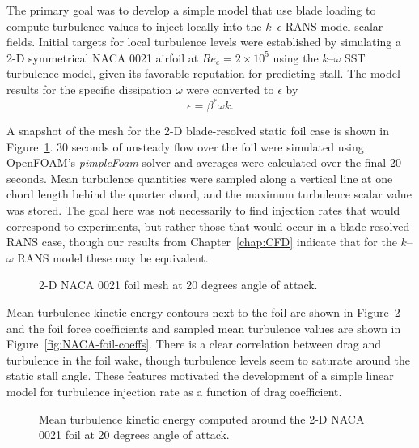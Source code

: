 The primary goal was to develop a simple model that use blade loading to compute
turbulence values to inject locally into the $k$--$\epsilon$ RANS model scalar
fields. Initial targets for local turbulence levels were established by
simulating a 2-D symmetrical NACA 0021 airfoil at $Re_c = 2 \times 10^5$ using
the $k$--$\omega$ SST turbulence model, given its favorable reputation for
predicting stall. The model results for the specific dissipation $\omega$ were
converted to $\epsilon$ by \cite{Wilcox1994}
\begin{equation}
    \epsilon = \beta^* \omega k.
\end{equation}

A snapshot of the mesh for the 2-D blade-resolved static foil case is shown in
Figure~\ref{fig:NACA-foil-mesh}. 30 seconds of unsteady flow over the foil were
simulated using OpenFOAM's \textit{pimpleFoam} solver and averages were
calculated over the final 20 seconds. Mean turbulence quantities were sampled
along a vertical line at one chord length behind the quarter chord, and the
maximum turbulence scalar value was stored. The goal here was not necessarily to
find injection rates that would correspond to experiments, but rather those that
would occur in a blade-resolved RANS case, though our results from
Chapter~\ref{chap:CFD} indicate that for the $k$--$\omega$ RANS model these may
be equivalent.

\begin{figure}
    \centering
    
    \caption{2-D NACA 0021 foil mesh at 20 degrees angle of attack.}
    
    \label{fig:NACA-foil-mesh}
\end{figure}

Mean turbulence kinetic energy contours next to the foil are shown in
Figure~\ref{fig:NACA-foil-k} and the foil force coefficients and sampled mean
turbulence values are shown in Figure~\ref{fig:NACA-foil-coeffs}. There is a
clear correlation between drag and turbulence in the foil wake, though
turbulence levels seem to saturate around the static stall angle. These features
motivated the development of a simple linear model for turbulence injection rate
as a function of drag coefficient.

\begin{figure}
    \centering
    
    \caption{Mean turbulence kinetic energy computed around the 2-D NACA 0021
        foil at 20 degrees angle of attack.}
    
    \label{fig:NACA-foil-k}
\end{figure}

